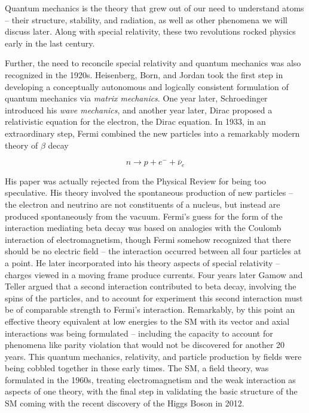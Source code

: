 Quantum mechanics is the theory that grew out of our need to understand atoms
-- their structure, stability, and radiation, as well as other phenomena we
will discuss later. Along with special relativity, these two revolutions rocked
physics early in the last century. 

Further, the need to reconcile special relativity and quantum mechanics was
also recognized in the 1920s. Heisenberg, Born, and Jordan took the first step
in developing a conceptually autonomous and logically consistent formulation of
quantum mechanics via \textit{matrix mechanics}. One year later, Schroedinger
introduced his \textit{wave mechanics}, and another year later, Dirac proposed
a relativistic equation for the electron, the Dirac equation. In 1933, in an
extraordinary step, Fermi combined the new particles into a remarkably modern
theory of $\beta$ decay

\[
  n \rightarrow p + e^- + \bar{\nu}_e
\] \vspace{3px}

His paper was actually rejected from the Physical Review for being too
speculative. His theory involved the spontaneous production of new particles --
the electron and neutrino are not constituents of a nucleus, but instead are
produced spontaneously from the vacuum. Fermi’s guess for the form of the
interaction mediating beta decay was based on analogies with the Coulomb
interaction of electromagnetism, though Fermi somehow recognized that there
should be no electric field -- the interaction occurred between all four
particles at a point. He later incorporated into his theory aspects of special
relativity -- charges viewed in a moving frame produce currents. Four years
later Gamow and Teller argued that a second interaction contributed to beta
decay, involving the spins of the particles, and to account for experiment this
second interaction must be of comparable strength to Fermi’s interaction.
Remarkably, by this point an effective theory equivalent at low energies to the
SM with its vector and axial interactions was being formulated -- including the
capacity to account for phenomena like parity violation that would not be
discovered for another 20 years. This quantum mechanics, relativity, and
particle production by fields were being cobbled together in these early times.
The SM, a field theory, was formulated in the 1960s, treating electromagnetism
and the weak interaction as aspects of one theory, with the final step in
validating the basic structure of the SM coming with the recent discovery of
the Higgs Boson in 2012.

